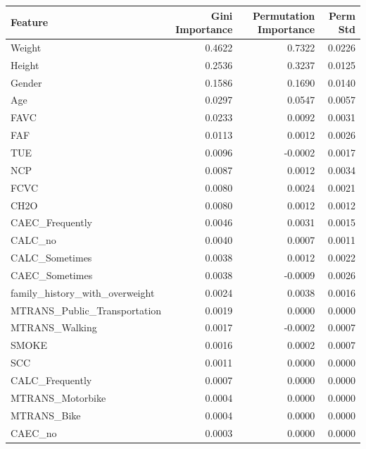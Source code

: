 \begin{tabular}{lrrr}
\toprule
Feature & Gini Importance & Permutation Importance & Perm Std \\
\midrule
Weight & 0.4622 & 0.7322 & 0.0226 \\
Height & 0.2536 & 0.3237 & 0.0125 \\
Gender & 0.1586 & 0.1690 & 0.0140 \\
Age & 0.0297 & 0.0547 & 0.0057 \\
FAVC & 0.0233 & 0.0092 & 0.0031 \\
FAF & 0.0113 & 0.0012 & 0.0026 \\
TUE & 0.0096 & -0.0002 & 0.0017 \\
NCP & 0.0087 & 0.0012 & 0.0034 \\
FCVC & 0.0080 & 0.0024 & 0.0021 \\
CH2O & 0.0080 & 0.0012 & 0.0012 \\
CAEC\_Frequently & 0.0046 & 0.0031 & 0.0015 \\
CALC\_no & 0.0040 & 0.0007 & 0.0011 \\
CALC\_Sometimes & 0.0038 & 0.0012 & 0.0022 \\
CAEC\_Sometimes & 0.0038 & -0.0009 & 0.0026 \\
family\_history\_with\_overweight & 0.0024 & 0.0038 & 0.0016 \\
MTRANS\_Public\_Transportation & 0.0019 & 0.0000 & 0.0000 \\
MTRANS\_Walking & 0.0017 & -0.0002 & 0.0007 \\
SMOKE & 0.0016 & 0.0002 & 0.0007 \\
SCC & 0.0011 & 0.0000 & 0.0000 \\
CALC\_Frequently & 0.0007 & 0.0000 & 0.0000 \\
MTRANS\_Motorbike & 0.0004 & 0.0000 & 0.0000 \\
MTRANS\_Bike & 0.0004 & 0.0000 & 0.0000 \\
CAEC\_no & 0.0003 & 0.0000 & 0.0000 \\
\bottomrule
\end{tabular}
